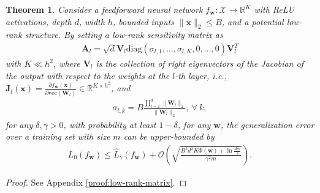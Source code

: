 \documentclass[10pt,a4paper]{amsart}
\newtheorem{theorem}{Theorem}
\newcommand{\Norm}[1]{\|#1\|}
\newcommand{\R}{\mathbb{R}}
\def\gO{{\mathcal{O}}}
\def\gX{{\mathcal{X}}}
\def\mA{{\bm{A}}}
\def\mJ{{\bm{J}}}
\def\mV{{\bm{V}}}
\def\mW{{\bm{W}}}
\def\vw{{\bm{w}}}
\def\vx{{\bm{x}}}
\begin{document}
\begin{theorem}\label{thm:low-rank-matrix}
Consider a feedforward neural network $f_{\vw}: \gX \to \R^K$ with ReLU activations, depth $d$, width $h$, bounded inputs $\Norm{\vx}_2 \le B$, and a potential low-rank structure.
    By setting a low-rank sensitivity matrix as 
\begin{align} \label{eq:low-rank-Al}
    \mA_l = \sqrt{d} \mV_l \mathrm{diag}(\sigma_{l,1},\dots,\sigma_{l,K},0,\dots,0)\mV_l^T
\end{align}
with $K\ll h^2$, where $\mV_l$ is the collection of right eigenvectors of the Jacobian of the output with respect to the weights at the $l$-th layer, i.e., $\mJ_l(\vx) = \frac{\partial f_{\vw}(\vx)}{\partial \mathrm{vec}(\mW_l)} \in \R^{K \times h^2}$, and
\begin{align}
    \sigma_{l,k} = B\frac{\prod_{l=1}^d \Norm{\mW_l}_2}{\Norm{\mW_l}_2}, \ \forall~k,
\end{align}
 for any $\delta,\gamma>0$, with probability at least $1-\delta$, for any $\vw$, the generalization error over a training set with size $m$ can be upper-bounded by
    \begin{align}
    L_0(f_{\vw}) \le \hat{L}_{\gamma}(f_{\vw}) + \gO \left( \sqrt{ \frac{B^2d^2K \Phi(\vw) + \ln \frac{dm}{\delta}}{\gamma^2m}} \right).
    \end{align}
\end{theorem}

\begin{proof}
See Appendix \ref{proof:low-rank-matrix}.
\end{proof}
\end{document}
